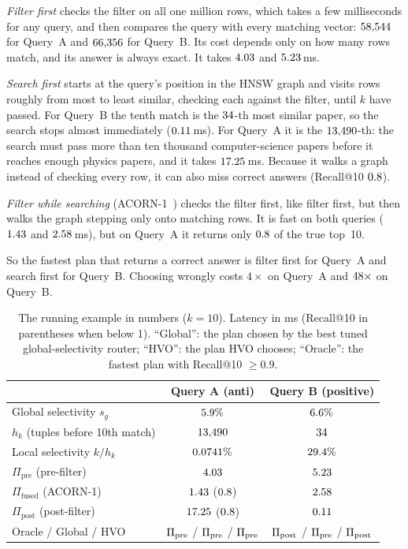 \documentclass[sigconf, nonacm]{acmart}
\newcommand{\Ppre}{\Pi_{\text{pre}}}
\newcommand{\Pfus}{\Pi_{\text{fused}}}
\newcommand{\Ppost}{\Pi_{\text{post}}}
\begin{document}
\emph{Filter first} checks the filter on all one million rows, which takes a few milliseconds for any query, and then compares the query with every matching vector: $58{,}544$ for Query~A and $66{,}356$ for Query~B. Its cost depends only on how many rows match, and its answer is always exact. It takes $4.03$ and $5.23$\,ms.

\emph{Search first} starts at the query's position in the HNSW graph and visits rows roughly from most to least similar, checking each against the filter, until $k$ have passed. For Query~B the tenth match is the $34$-th most similar paper, so the search stops almost immediately ($0.11$\,ms). For Query~A it is the $13{,}490$-th: the search must pass more than ten thousand computer-science papers before it reaches enough physics papers, and it takes $17.25$\,ms. Because it walks a graph instead of checking every row, it can also miss correct answers (Recall@10 $0.8$).

\emph{Filter while searching} (ACORN-1~\cite{patel2024acorn}) checks the filter first, like filter first, but then walks the graph stepping only onto matching rows. It is fast on both queries ($1.43$ and $2.58$\,ms), but on Query~A it returns only $0.8$ of the true top~10.

So the fastest plan that returns a correct answer is filter first for Query~A and search first for Query~B. Choosing wrongly costs $4\times$ on Query~A and $48\times$ on Query~B.

\begin{table}[!t]
\footnotesize
\centering
\caption{The running example in numbers ($k=10$). Latency in ms (Recall@10 in parentheses when below 1). ``Global'': the plan chosen by the best tuned global-selectivity router; ``HVO'': the plan HVO chooses; ``Oracle'': the fastest plan with Recall@10 $\ge0.9$.}
\label{tab:example}
\setlength{\tabcolsep}{3pt}
\begin{tabular}{lcc}
\toprule
 & Query A (anti) & Query B (positive) \\
\midrule
Global selectivity $s_g$ & $5.9\%$ & $6.6\%$ \\
$h_k$ (tuples before 10th match) & $13{,}490$ & $34$ \\
Local selectivity $k/h_k$ & $0.0741\%$ & $29.4\%$ \\
\midrule
$\Ppre$ (pre-filter) & $4.03$ & $5.23$ \\
$\Pfus$ (ACORN-1) & $1.43$ ($0.8$) & $2.58$ \\
$\Ppost$ (post-filter) & $17.25$ ($0.8$) & $0.11$ \\
\midrule
Oracle / Global / HVO & $\ExAOracle$ / $\ExAGlobal$ / $\ExAHvo$ & $\ExBOracle$ / $\ExBGlobal$ / $\ExBHvo$ \\
\bottomrule
\end{tabular}
\end{table}
\end{document}
